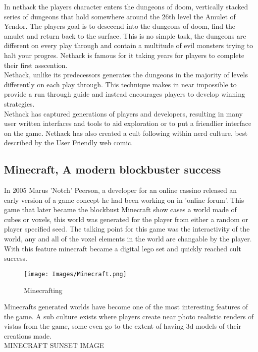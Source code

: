 In nethack the players character enters the dungeons of doom, vertically stacked
series of dungeons that hold somewhere around the 26th level the Amulet of 
Yendor. The players goal is to desecend into the dungeons of doom, find the
amulet and return back to the surface. This is no simple task, the dungeons are 
different on every play through and contain a multitude of evil monsters trying
to halt your progres. Nethack is famous for it taking years for players to 
complete their first asscention.\\

Nethack, unlike its predecessors generates the dungeons in the majority of levels
differently on each play through. This technique makes in near impossible to 
provide a run through guide and instead encourages players to develop winning
strategies.\\

Nethack has captured generations of players and developers, resulting in many 
user written interfaces and tools to aid exploration or to put a friendlier 
interface on the game. Nethack has also created a cult following within nerd 
culture, best described by the User Friendly web comic.\\

\subsection*{Minecraft, A modern blockbuster success}
In 2005 Marus 'Notch' Peerson, a developer for an online cassino released an
early version of a game concept he had been working on in 'online forum'. This
game that later became the blockbust Minecraft show cases a world made of cubes 
or voxels, this world was generated for the player from either a random or 
player specified seed. The talking point for this game was the interactivity of
the world, any and all of the voxel elements in the world are changable by the
player. With this feature minecraft became a digital lego set and quickly 
reached cult success.\\

\begin{figure}[h!]
  \texttt{[image: Images/Minecraft.png]}
  \caption{Minecrafting}
\end{figure}

Minecrafts generated worlds have become one of the most interesting features of 
the game. A sub culture exists where players create near photo realistic renders
of vistas from the game, some even go to the extent of having 3d models of their
creations made. \\

MINECRAFT SUNSET IMAGE\\
